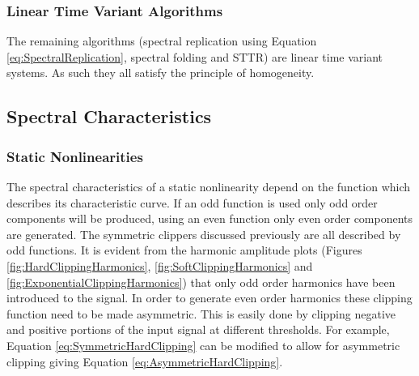 		\subsubsection*{Linear Time Variant Algorithms}
			The remaining algorithms (spectral replication using Equation \ref{eq:SpectralReplication},
			spectral folding and STTR) are linear time variant systems. As such they all satisfy the principle
			of homogeneity.

%			
%
%			

	\subsection{Spectral Characteristics}
	\label{sec:ExcitationEvaluation-Comparison-SpectralCharacteristics}
		\subsubsection*{Static Nonlinearities}
			The spectral characteristics of a static nonlinearity depend on the function which describes its
			characteristic curve. If an odd function is used only odd order components will be produced, using
			an even function only even order components are generated. The symmetric clippers discussed
			previously are all described by odd functions. It is evident from the harmonic amplitude plots
			(Figures \ref{fig:HardClippingHarmonics}, \ref{fig:SoftClippingHarmonics} and
			\ref{fig:ExponentialClippingHarmonics}) that only odd order harmonics have been introduced to the
			signal. In order to generate even order harmonics these clipping function need to be made
			asymmetric. This is easily done by clipping negative and positive portions of the input signal at
			different thresholds. For example, Equation \ref{eq:SymmetricHardClipping} can be modified to allow
			for asymmetric clipping giving Equation \ref{eq:AsymmetricHardClipping}.
			
